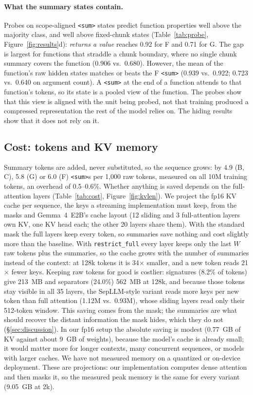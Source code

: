 \documentclass[11pt]{article}
\newcommand{\sumtok}{\texttt{<sum>}}
\begin{document}
\paragraph{What the summary states contain.}
Probes on scope-aligned \sumtok{} states predict function properties well
above the majority class, and well above fixed-chunk states
(Table~\ref{tab:probe}, Figure~\ref{fig:results}d): \emph{returns a value} reaches 0.92 for F and 0.71
for G. The gap is largest for functions that straddle a chunk boundary, where
no single chunk summary covers the function (0.906 vs.\ 0.680). However, the
mean of the function's raw hidden states matches or beats the F \sumtok{}
(0.939 vs.\ 0.922; 0.723 vs.\ 0.640 on argument count). A \sumtok{} at the end
of a function attends to that function's tokens, so its state is a pooled view
of the function. The probes show that this view is aligned with the unit
being probed, not that training produced a compressed representation the
rest of the model relies on. The hiding results show that it does not rely
on it.

\subsection{Cost: tokens and KV memory}\label{sec:cost}

Summary tokens are added, never substituted, so the sequence grows: by 4.9
(B, C), 5.8 (G) or 6.0 (F) \sumtok{}s per 1{,}000 raw tokens, measured on all
10M training tokens, an overhead of 0.5--0.6\%. Whether anything is saved
depends on the full-attention layers (Table~\ref{tab:cost},
Figure~\ref{fig:kvlen}). We project the fp16 KV cache per sequence, the keys
a streaming implementation must keep, from the masks and Gemma~4~E2B's cache
layout (12 sliding and 3 full-attention layers own KV, one KV head each; the
other 20 layers share them). With the standard mask the full layers keep
every token, so summaries save nothing and cost slightly more than the
baseline. With \texttt{restrict\_full} every layer keeps only the last $W$
raw tokens plus the summaries, so the cache grows with the number of
summaries instead of the context: at 128k tokens it is 34$\times$ smaller,
and a new token reads 21$\times$ fewer keys. Keeping raw tokens for good is
costlier: signatures (8.2\% of tokens) give 213~MB and separators (24.0\%)
562~MB at 128k, and because those tokens stay visible in all 35 layers,
the SepLLM-style variant reads more keys per new token than full attention
(1.12M vs.\ 0.93M), whose sliding layers read only their 512-token window.
This saving comes from the mask; the summaries are what should recover the
distant information the mask hides, which they do not
(\S\ref{sec:discussion}). In our fp16
setup the absolute saving is modest (0.77~GB of KV against about 9~GB of
weights), because the model's cache is already small; it would matter more
for longer contexts, many concurrent sequences, or models with larger
caches. We have not measured memory on a quantized or on-device deployment. These are
projections: our implementation computes dense attention and then masks it,
so the measured peak memory is the same for every variant (9.05~GB at 2k).
\end{document}
